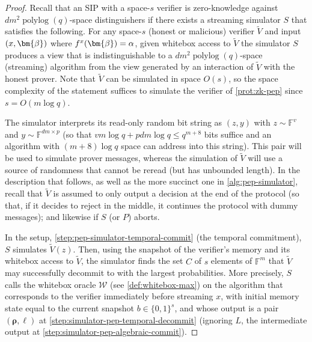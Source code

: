 \documentclass[10pt,a4paper]{article}
\theoremstyle{definition}
\newcommand{\field}{\mathbb{F}}
\newcommand{\polylog}{\operatorname{polylog}}
\newcommand{\bitset}{\{0,1\}}
\newcommand{\vcommitlength}{v}
\newcommand{\vcommitstring}{z}
\newcommand{\pcommitlength}{p}
\newcommand{\pcommitstring}{y}
\newcommand{\dimension}{m}
\newcommand{\degree}{d}
\newcommand{\fieldsize}{q}
\newcommand{\evaluationpoint}{\bm{\fe2}}
\newcommand{\fingerprinttuple}{\bm{\rho}}
\renewcommand{\line}{L}
\newcommand{\snapshot}{b}
\newcommand{\whiteboxoracle}{\mathcal{W}}
\def\fe#1{
    \ifnum#1=1
        \alpha
    \else
    \ifnum#1=2
        \beta
    \else
    \ifnum#1=3
        \gamma
    \fi\fi\fi
}
\begin{document}
\begin{proof}
    Recall that an SIP with a space-$s$ verifier is zero-knowledge against $\degree\dimension^2 \polylog(\fieldsize)$-space distinguishers if there exists a streaming simulator $S$ that satisfies the following. For any space-$s$ (honest or malicious) verifier $\widetilde V$ and input $(x, \evaluationpoint)$ where $f^x(\evaluationpoint) = \fe1$, given whitebox access to $\widetilde V$ the simulator $S$ produces a view that is indistinguishable to a $\degree\dimension^2 \polylog(\fieldsize)$-space (streaming) algorithm from the view generated by an interaction of $\widetilde V$ with the honest prover. Note that $\widetilde V$ can be simulated in space $O(s)$, so the space complexity of the statement suffices to simulate the verifier of \cref{prot:zk-pep} since  $s = O(\dimension \log \fieldsize)$.

    The simulator interprets its read-only random bit string as $(\vcommitstring, \pcommitstring)$ with $\vcommitstring \sim \field^\vcommitlength$ and $\pcommitstring \sim \field^{\degree \dimension \times \pcommitlength}$ (so that $\vcommitlength \dimension \log \fieldsize + \pcommitlength \degree \dimension \log \fieldsize \leq \fieldsize^{\dimension + 8}$ bits suffice and an algorithm with $(\dimension + 8) \log \fieldsize$ space can address into this string). This pair will be used to simulate prover messages, whereas the simulation of $\widetilde V$ will use a source of randomness that cannot be reread (but has unbounded length). In the description that follows, as well as the more succinct one in \cref{alg:pep-simulator}, recall that $\widetilde V$ is assumed to only output a decision at the end of the protocol (so that, if it decides to reject in the middle, it continues the protocol with dummy messages); and likewise if $S$ (or $P$) aborts.

    In the setup, \cref{step:pep-simulator-temporal-commit} (the temporal commitment), $S$ simulates $\widetilde V(\vcommitstring)$. Then, using the snapshot of the verifier's memory and its whitebox access to $\widetilde V$, the simulator finds the set $C$ of $s$ elements of $\field^\dimension$ that $\widetilde V$ may successfully decommit to with the largest probabilities. More precisely, $S$ calls the whitebox oracle $\whiteboxoracle$ (see \cref{def:whitebox-max}) on the algorithm that corresponds to the verifier immediately before streaming $x$, with initial memory state equal to the current snapshot $\snapshot \in \bitset^s$, and whose output is a pair $(\fingerprinttuple, \ell)$ at \cref{step:simulator-pep-temporal-decommit} (ignoring $\line$, the intermediate output at \cref{step:simulator-pep-algebraic-commit}).
    

\end{proof}
\end{document}
